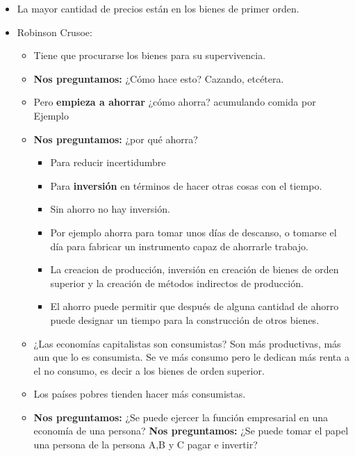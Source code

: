 \begin{itemize}
    \item La mayor cantidad de precios están en los bienes de primer orden.
    \item Robinson Crusoe: 
    \begin{itemize}
        \item Tiene que procurarse los bienes para su supervivencia.
        \item \textbf{Nos preguntamos:} ¿Cómo hace esto? Cazando, etcétera.
        \item Pero \textbf{empieza a ahorrar} ¿cómo ahorra? acumulando comida por Ejemplo
        \item \textbf{Nos preguntamos:} ¿por qué ahorra?
        \begin{itemize}
            \item Para reducir incertidumbre
            \item Para \textbf{inversión} en términos de hacer otras cosas con el tiempo.
            \item Sin ahorro no hay inversión.
            \item Por ejemplo ahorra para tomar unos días de descanso, o tomarse el día para fabricar un instrumento capaz de ahorrarle trabajo.
            \item La creacion de producción, inversión en creación de bienes de orden superior y la creación de métodos indirectos de producción.  %
            \item El ahorro puede permitir que después de alguna cantidad de ahorro puede designar un tiempo para la construcción de otros bienes.
        \end{itemize}
        
        \item ¿Las economías capitalistas son consumistas? Son más productivas, más aun que lo es consumista. Se ve más consumo pero le dedican más renta a el no consumo, es decir a los bienes de orden superior.
        \item Los países pobres tienden hacer más consumistas.
        \item \textbf{Nos preguntamos:} ¿Se puede ejercer la función empresarial en una economía de una persona? \textbf{Nos preguntamos:} ¿Se puede tomar el papel una persona de la persona A,B y C pagar e invertir?
    \end{itemize}
\end{itemize}



